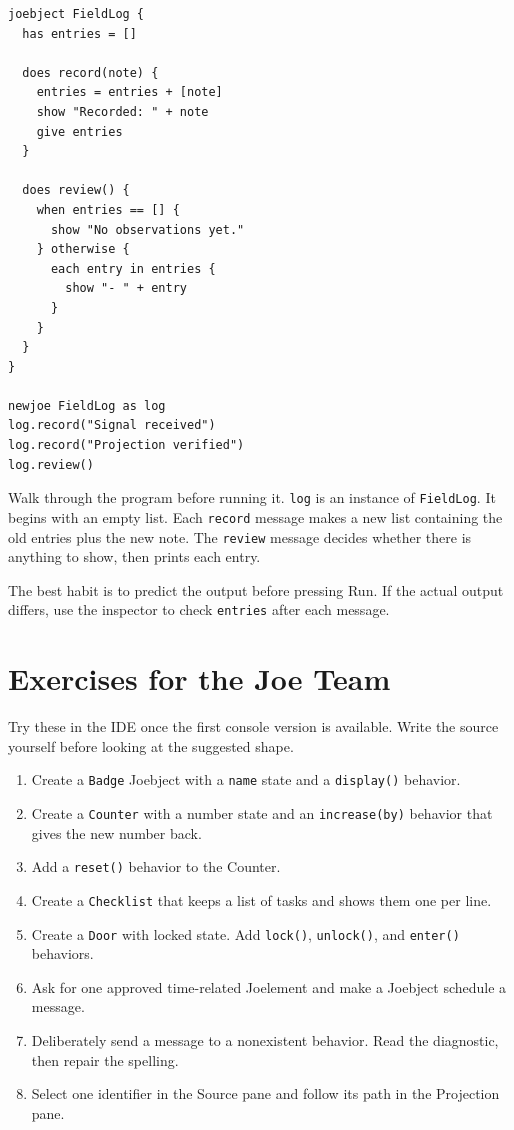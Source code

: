 \documentclass[12pt]{article}
\newcommand{\kw}[1]{\texttt{#1}}
\begin{document}
\begin{lstlisting}[style=joe]
joebject FieldLog {
  has entries = []

  does record(note) {
    entries = entries + [note]
    show "Recorded: " + note
    give entries
  }

  does review() {
    when entries == [] {
      show "No observations yet."
    } otherwise {
      each entry in entries {
        show "- " + entry
      }
    }
  }
}

newjoe FieldLog as log
log.record("Signal received")
log.record("Projection verified")
log.review()
\end{lstlisting}

Walk through the program before running it. \kw{log} is an instance of \kw{FieldLog}. It begins with an empty list. Each \kw{record} message makes a new list containing the old entries plus the new note. The \kw{review} message decides whether there is anything to show, then prints each entry.

The best habit is to predict the output before pressing Run. If the actual output differs, use the inspector to check \kw{entries} after each message.

\clearpage
\section{Exercises for the Joe Team}
Try these in the IDE once the first console version is available. Write the source yourself before looking at the suggested shape.

\begin{enumerate}
  \item Create a \kw{Badge} Joebject with a \kw{name} state and a \kw{display()} behavior.
  \item Create a \kw{Counter} with a number state and an \kw{increase(by)} behavior that gives the new number back.
  \item Add a \kw{reset()} behavior to the Counter.
  \item Create a \kw{Checklist} that keeps a list of tasks and shows them one per line.
  \item Create a \kw{Door} with locked state. Add \kw{lock()}, \kw{unlock()}, and \kw{enter()} behaviors.
  \item Ask for one approved time-related Joelement and make a Joebject schedule a message.
  \item Deliberately send a message to a nonexistent behavior. Read the diagnostic, then repair the spelling.
  \item Select one identifier in the Source pane and follow its path in the Projection pane.
\end{enumerate}
\end{document}
